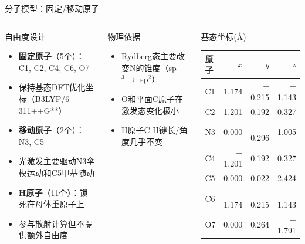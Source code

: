 \documentclass[aspectratio=169,9pt]{beamer}
\begin{document}
\begin{frame}{分子模型：固定/移动原子}
  \begin{columns}[T]
    \begin{block}{自由度设计}
      \scriptsize
      \begin{itemize}
        \item \textbf{固定原子}（5个）：C1, C2, C4, C6, O7
        \item 保持基态DFT优化坐标（B3LYP/6-311++G**）
        \item \textbf{移动原子}（2个）：N3, C5
        \item 光激发主要驱动N3伞模运动和C5甲基随动
        \item \textbf{H原子}（11个）：锁死在母体重原子上
        \item 参与散射计算但不提供额外自由度
      \end{itemize}
    \end{block}

    \begin{exampleblock}{物理依据}
      \scriptsize
      \begin{itemize}
        \item Rydberg态主要改变N的锥度（sp$^3 \to$ sp$^2$）
        \item O和平面C原子在激发态变化极小
        \item H原子C-H键长/角度几乎不变
      \end{itemize}
    \end{exampleblock}

    \begin{block}{基态坐标(\AA)}
      \scriptsize
      \renewcommand{\arraystretch}{1.05}
      \begin{tabular}{@{}lrrr@{}}
        \toprule
        原子 & $x$ & $y$ & $z$ \\
        \midrule
        C1 & 1.174 & $-$0.215 & $-$1.143 \\
        C2 & 1.201 & 0.192 & 0.327 \\
        \textcolor{sciblue}{N3} & \textcolor{sciblue}{0.000} & \textcolor{sciblue}{$-$0.296} & \textcolor{sciblue}{1.005} \\
        C4 & $-$1.201 & 0.192 & 0.327 \\
        \textcolor{scigreen}{C5} & \textcolor{scigreen}{0.000} & \textcolor{scigreen}{0.022} & \textcolor{scigreen}{2.424} \\
        C6 & $-$1.174 & $-$0.215 & $-$1.143 \\
        O7 & 0.000 & 0.264 & $-$1.791 \\
        \bottomrule
      \end{tabular}
    \end{block}


\end{columns}
\end{frame}
\end{document}

